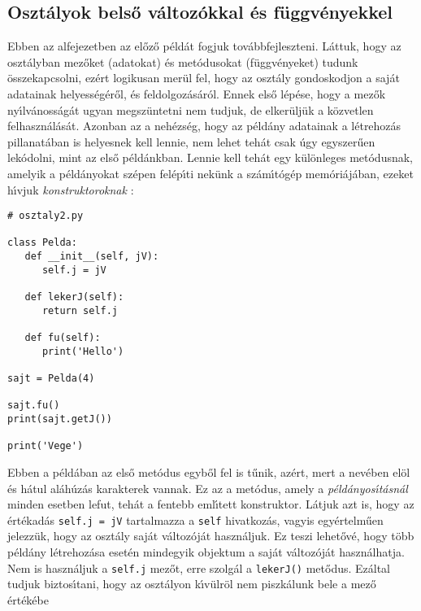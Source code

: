 \subsection{Oszt\'alyok bels\H{o} v\'altoz\'okkal \'es f\"uggv\'enyekkel}

Ebben az alfejezetben az el\H{o}z\H{o} p\'eld\'at fogjuk tov\'abbfejleszteni. L\'attuk, hogy az oszt\'alyban mez\H{o}ket 
(adatokat) \'es met\'odusokat (f\"uggv\'enyeket) tudunk \"osszekapcsolni, ez\'ert logikusan mer\"ul fel, hogy az oszt\'aly 
gondoskodjon a saj\'at adatainak helyess\'eg\'er\H{o}l, \'es feldolgoz\'as\'ar\'ol. Ennek els\H{o} l\'ep\'ese, hogy a 
mez\H{o}k ny\'{\i}lv\'anoss\'ag\'at ugyan megsz\"untetni nem tudjuk, de elker\"ulj\"uk a k\"ozvetlen felhaszn\'al\'as\'at. 
Azonban az a neh\'ezs\'eg, hogy az p\'eld\'any adatainak a l\'etrehoz\'as pillanat\'aban is helyesnek kell lennie, nem lehet 
teh\'at csak \'ugy egyszer\H{u}en lek\'odolni, mint az els\H{o} p\'eld\'ankban. Lennie kell teh\'at egy k\"ul\"onleges 
met\'o\-dus\-nak, amelyik a p\'eld\'anyokat sz\'epen fel\'ep\'{\i}ti nek\"unk a sz\'am\'{\i}t\'og\'ep mem\'ori\'aj\'aban, 
ezeket h\'{\i}vjuk {\sl konstruktoroknak} :

\begin{Verbatim}[fontsize=\small]
# osztaly2.py

class Pelda:
   def __init__(self, jV):
      self.j = jV

   def lekerJ(self):
      return self.j

   def fu(self):
      print('Hello')

sajt = Pelda(4)

sajt.fu()
print(sajt.getJ())

print('Vege')
\end{Verbatim}

\noindent Ebben a p\'eld\'aban az els\H{o} met\'odus egyb\H{o}l fel is t\H{u}nik, az\'ert, mert a nev\'eben 
el\"ol \'es h\'atul al\'ah\'uz\'as karakterek vannak. Ez az a met\'odus, amely a {\sl p\'eld\'anyos\'{\i}\-t\'as\-n\'al} 
 minden esetben lefut, teh\'at a fentebb eml\'{\i}tett konstruktor. L\'atjuk azt is, 
hogy az \'ert\'ekad\'as {\tt self.j = jV} tartalmazza a {\tt self} hivatkoz\'as, vagyis egy\'ertelm\H{u}en jelezz\"uk, 
hogy az oszt\'aly saj\'at v\'altoz\'oj\'at haszn\'aljuk. Ez teszi lehet\H{o}v\'e, hogy t\"obb p\'eld\'any 
l\'etrehoz\'asa eset\'en mindegyik objektum a saj\'at v\'altoz\'oj\'at haszn\'al\-hat\-ja. Nem is haszn\'aljuk a 
{\tt self.j} mez\H{o}t, erre szolg\'al a {\tt lekerJ()} met\H{o}dus. Ez\'altal tudjuk biztos\'{\i}tani, hogy az 
oszt\'alyon k\'{\i}v\"ulr\"ol nem piszk\'alunk bele a mez\H{o} \'ert\'ek\'ebe

